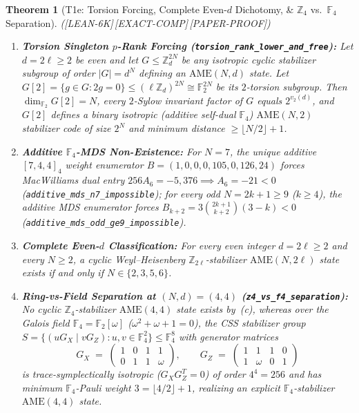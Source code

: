 \documentclass[11pt,reqno]{amsart}
\newtheorem{theorem}{Theorem}[section]
\theoremstyle{definition}
\newcommand{\ZZ}{\mathbb{Z}}
\newcommand{\FF}{\mathbb{F}}
\newcommand{\AME}{\mathrm{AME}}
\newcommand{\lid}[1]{{\footnotesize\nolinkurl{#1}}}
\newcommand{\tagL}{\textsf{\footnotesize[LEAN-6K]}}
\newcommand{\tagE}{\textsf{\footnotesize[EXACT-COMP]}}
\newcommand{\tagP}{\textsf{\footnotesize[PAPER-PROOF]}}
\begin{document}
\begin{theorem}[T1e: Torsion Forcing, Complete Even-$d$ Dichotomy, \& $\ZZ_4$ vs.\ $\FF_4$ Separation]
\label{thm:t1e}
\textup{(\tagL\,\tagE\,\tagP)}
\begin{enumerate}[label=(\alph*)]
  \item \textbf{Torsion Singleton $p$-Rank Forcing (\lid{torsion_rank_lower_and_free}):}
    Let $d = 2\ell \ge 2$ be even and let $G \le \ZZ_d^{2N}$ be any isotropic cyclic
    stabilizer subgroup of order $|G| = d^N$ defining an $\AME(N, d)$ state. Let
    $G[2] = \{g \in G : 2g = 0\} \le (\ell \ZZ_d)^{2N} \cong \FF_2^{2N}$ be its
    $2$-torsion subgroup. Then $\dim_{\FF_2} G[2] = N$, every $2$-Sylow invariant factor
    of $G$ equals $2^{v_2(d)}$, and $G[2]$ defines a binary isotropic (additive self-dual
    $\FF_4$) $\AME(N, 2)$ stabilizer code of size $2^N$ and minimum distance $\ge \lfloor
    N/2 \rfloor + 1$.
  \item \textbf{Additive $\FF_4$-MDS Non-Existence:} For $N = 7$, the unique additive
    $[7, 4, 4]_4$ weight enumerator $B = (1, 0, 0, 0, 105, 0, 126, 24)$ forces MacWilliams
    dual entry $256 A_6 = -5{,}376 \implies A_6 = -21 < 0$
    (\lid{additive_mds_n7_impossible}); for every odd $N = 2k+1 \ge 9$ ($k \ge 4$), the
    additive MDS enumerator forces $B_{k+2} = 3\binom{2k+1}{k+2}(3-k) < 0$
    (\lid{additive_mds_odd_ge9_impossible}).
  \item \textbf{Complete Even-$d$ Classification:} For every even integer $d = 2\ell \ge 2$
    and every $N \ge 2$, a cyclic Weyl--Heisenberg $\ZZ_{2\ell}$-stabilizer $\AME(N, 2\ell)$
    state exists \emph{if and only if} $N \in \{2, 3, 5, 6\}$.
  \item \textbf{Ring-vs-Field Separation at $(N, d) = (4, 4)$ (\lid{z4_vs_f4_separation}):}
    No cyclic $\ZZ_4$-stabilizer $\AME(4, 4)$ state exists by~(c), whereas over the
    Galois field $\FF_4 = \FF_2[\omega]$ ($\omega^2 + \omega + 1 = 0$), the CSS
    stabilizer group $S = \{(u G_X \mid v G_Z) : u, v \in \FF_4^2\} \le \FF_4^8$ with
    generator matrices
    \begin{equation}
      \label{eq:f4-css}
      G_X \;=\; \begin{pmatrix} 1 & 0 & 1 & 1 \\ 0 & 1 & 1 & \omega \end{pmatrix},
      \qquad
      G_Z \;=\; \begin{pmatrix} 1 & 1 & 1 & 0 \\ 1 & \omega & 0 & 1 \end{pmatrix}
    \end{equation}
    is trace-symplectically isotropic ($G_X G_Z^T = 0$) of order $4^4 = 256$ and has
    minimum $\FF_4$-Pauli weight $3 = \lfloor 4/2 \rfloor + 1$, realizing an explicit
    $\FF_4$-stabilizer $\AME(4, 4)$ state.
\end{enumerate}
\end{theorem}
\end{document}
